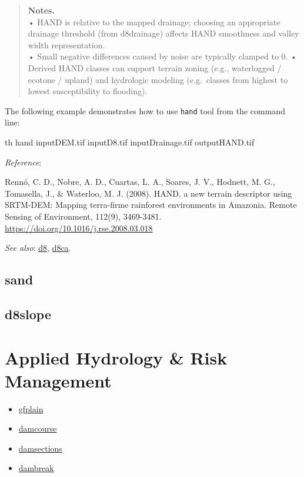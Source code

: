 \documentclass[
]{book}
\newenvironment{Shaded}{\begin{snugshade}}{\end{snugshade}}
\newcommand{\ExtensionTok}[1]{#1}
\newcommand{\NormalTok}[1]{#1}
\providecommand{\tightlist}{%
  \setlength{\itemsep}{0pt}\setlength{\parskip}{0pt}}
\begin{document}
\begin{quote}
\textbf{Notes.}\\
• HAND is relative to the mapped drainage; choosing an appropriate drainage threshold (from d8drainage) affects HAND smoothness and valley width representation.\\
• Small negative differences caused by noise are typically clamped to 0.
• Derived HAND classes can support terrain zoning (e.g., waterlogged / ecotone / upland) and hydrologic modeling (e.g.~classes from highest to lowest susceptibility to flooding).
\end{quote}

The following example demonstrates how to use \texttt{hand} tool from the command line:

\begin{Shaded}
\begin{Highlighting}[]
\ExtensionTok{th}\NormalTok{ hand inputDEM.tif inputD8.tif inputDrainage.tif outputHAND.tif}
\end{Highlighting}
\end{Shaded}

\emph{Reference}:

Rennó, C. D., Nobre, A. D., Cuartas, L. A., Soares, J. V., Hodnett, M. G., Tomasella, J., \& Waterloo, M. J. (2008). HAND, a new terrain descriptor using SRTM-DEM: Mapping terra-firme rainforest environments in Amazonia. Remote Sensing of Environment, 112(9), 3469-3481. \url{https://doi.org/10.1016/j.rse.2008.03.018}

\emph{See also}: \hyperref[d8]{d8}, \hyperref[d8ca]{d8ca}.

\subsection{sand}\label{sand}

\subsection{d8slope}\label{d8slope}

\section{Applied Hydrology \& Risk Management}\label{Applied-Hydrology-Risk-Management}

\begin{itemize}
\tightlist
\item
  \hyperref[gfplain]{gfplain}\\
\item
  \hyperref[damcourse]{damcourse}\\
\item
  \hyperref[damsections]{damsections}\\
\item
  \hyperref[dambreak]{dambreak}
\end{itemize}
\end{document}
